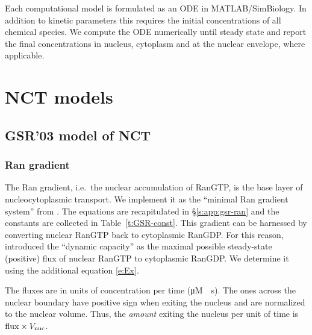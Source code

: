 \documentclass[12pt,notitlepage]{article}
\begin{document}

Each computational model is formulated as an ODE
in MATLAB/SimBiology.
%
In addition to kinetic parameters
this requires the initial concentrations of all chemical species.
%
We compute the ODE numerically until steady state
and report the final concentrations
in nucleus, cytoplasm and at the nuclear envelope, where applicable.



\section{NCT models}

\subsection{GSR'03 model of NCT} \label{s:GSR03}

\subsubsection*{Ran gradient} \label{s:GSR03:Ran}

The Ran gradient,
i.e.~the nuclear accumulation of {RanGTP},
is the base layer of nucleocytoplasmic transport.
%
%
We implement it as
the ``minimal Ran gradient system'' from 
\cite[%
\href{https://i.ibb.co/z2Rb3Qs/Goerlich-Seewald-Ribbeck-2003-Fig1.png}{Fig.~1},
\href{https://i.ibb.co/R6T7KRD/Goerlich-Seewald-Ribbeck-2003-Fig2.png}{Fig.~2},
etc.%
]{GoerlichSeewaldRibbeck2003}.
%
%
The equations are recapitulated in
\S\ref{s:app:gsr-ran}
and
the constants are collected in 
Table~\ref{t:GSR-const}.
%
%
This gradient
can be harnessed
by converting nuclear {RanGTP} back to cytoplasmic {RanGDP}.
%
For this reason,
\cite{GoerlichSeewaldRibbeck2003}
introduced
the ``dynamic capacity'' 
as the maximal possible steady-state (positive) flux
of nuclear {RanGTP} to cytoplasmic {RanGDP}.
%
We determine it using the additional equation \eqref{e:Ex}.

%

The fluxes 
are in units of concentration per time (\si{\micro M \per s}).
%
The ones across the nuclear boundary
have positive sign when exiting the nucleus
and are normalized to the nuclear volume.
%
Thus,
the \emph{amount} exiting the nucleus per unit of time is
$\ce{flux} \times V_\text{nuc}$.

%
\end{document}
